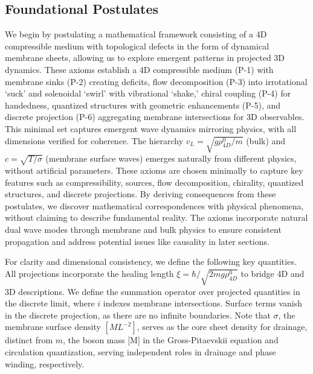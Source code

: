 \subsection{Foundational Postulates}

We begin by postulating a mathematical framework consisting of a 4D compressible medium with topological defects in the form of dynamical membrane sheets, allowing us to explore emergent patterns in projected 3D dynamics. These axioms establish a 4D compressible medium (P-1) with membrane sinks (P-2) creating deficits, flow decomposition (P-3) into irrotational `suck' and solenoidal `swirl' with vibrational `shake,' chiral coupling (P-4) for handedness, quantized structures with geometric enhancements (P-5), and discrete projection (P-6) aggregating membrane intersections for 3D observables. This minimal set captures emergent wave dynamics mirroring physics, with all dimensions verified for coherence. The hierarchy $v_L = \sqrt{g \rho_{4D}^0 / m}$ (bulk) and $c = \sqrt{T / \sigma}$ (membrane surface waves) emerges naturally from different physics, without artificial parameters. These axioms are chosen minimally to capture key features such as compressibility, sources, flow decomposition, chirality, quantized structures, and discrete projections. By deriving consequences from these postulates, we discover mathematical correspondences with physical phenomena, without claiming to describe fundamental reality. The axioms incorporate natural dual wave modes through membrane and bulk physics to ensure consistent propagation and address potential issues like causality in later sections.

For clarity and dimensional consistency, we define the following key quantities. All projections incorporate the healing length $\xi = \hbar / \sqrt{2 m g \rho_{4D}^0}$ to bridge 4D and 3D descriptions. We define the summation operator over projected quantities in the discrete limit, where $i$ indexes membrane intersections. Surface terms vanish in the discrete projection, as there are no infinite boundaries. Note that $\sigma$, the membrane surface density $[M L^{-2}]$, serves as the core sheet density for drainage, distinct from $m$, the boson mass [M] in the Gross-Pitaevskii equation and circulation quantization, serving independent roles in drainage and phase winding, respectively.

